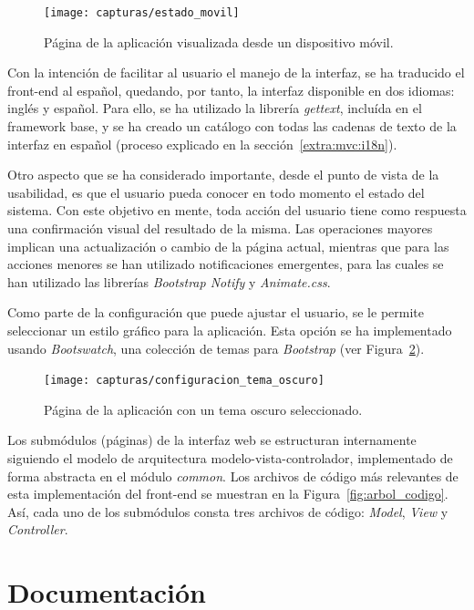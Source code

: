 \begin{figure}[!htp]
  \centering
  \texttt{[image: capturas/estado\_movil]}
  \caption{Página de la aplicación visualizada desde un dispositivo móvil.}
  \label{fig:captura:movil}
\end{figure}

Con la intención de facilitar al usuario el manejo de la interfaz, se ha traducido el \gls{front-end} al español, quedando, por tanto, la interfaz disponible en dos idiomas: inglés y español.
Para ello, se ha utilizado la librería \textit{gettext}, incluída en el \gls{framework} base, y se ha creado un catálogo con todas las cadenas de texto de la interfaz en español (proceso explicado en la sección~\ref{extra:mvc:i18n}).

Otro aspecto que se ha considerado importante, desde el punto de vista de la usabilidad, es que el usuario pueda conocer en todo momento el estado del sistema.
Con este objetivo en mente, toda acción del usuario tiene como respuesta una confirmación visual del resultado de la misma.
Las operaciones mayores implican una actualización o cambio de la página actual, mientras que para las acciones menores se han utilizado notificaciones emergentes, para las cuales se han utilizado las librerías \textit{Bootstrap Notify} y \textit{Animate.css}.

Como parte de la configuración que puede ajustar el usuario, se le permite seleccionar un estilo gráfico para la aplicación.
Esta opción se ha implementado usando \textit{Bootswatch}, una colección de temas para \textit{Bootstrap} (ver Figura~\ref{fig:captura:oscuro}).

\begin{figure}[!htp]
  \centering
  \texttt{[image: capturas/configuracion\_tema\_oscuro]}
  \caption{Página de la aplicación con un tema oscuro seleccionado.}
  \label{fig:captura:oscuro}
\end{figure}

Los submódulos (páginas) de la interfaz web se estructuran internamente siguiendo el modelo de arquitectura modelo-vista-controlador, implementado de forma abstracta en el módulo \textit{common}.
Los archivos de código más relevantes de esta implementación del \gls{front-end} se muestran en la Figura~\ref{fig:arbol_codigo}.
Así, cada uno de los submódulos consta tres archivos de código: \textit{Model}, \textit{View} y \textit{Controller}.

\section{Documentación \label{sec:imp:docs}}

